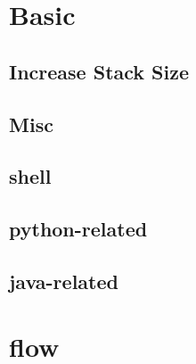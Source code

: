 \documentclass[a4paper,10pt,twocolumn,oneside]{article}
\begin{document}
\pagestyle{fancy}
\fancyfoot{}
\fancyhead[R]{\thepage}
\renewcommand{\headrulewidth}{0.4pt}
\renewcommand{\contentsname}{Contents} 

\scriptsize
\tableofcontents

\newpage

\section{Basic}
% 

\subsection{Increase Stack Size}


% 

\subsection{Misc}


\subsection{shell}


\subsection{python-related}


\subsection{java-related}


\section{flow}
\end{document}
